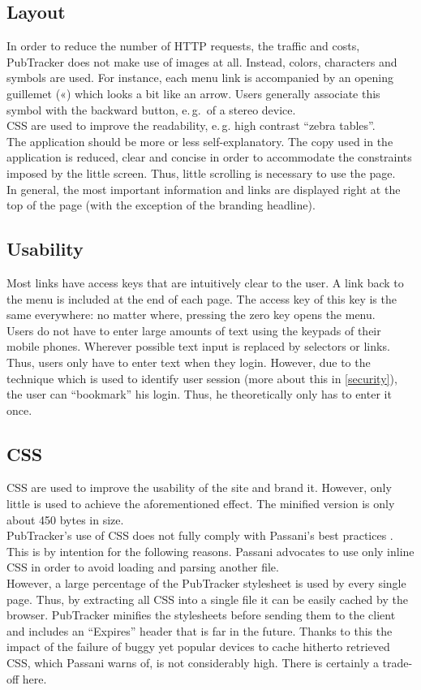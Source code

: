 \documentclass[a4paper,10pt]{scrartcl}
\begin{document}
\subsection{Layout}
In order to reduce the number of \ac{HTTP} requests, the traffic and costs,
PubTracker does not make use of images at all. Instead, colors, characters and
symbols are used. For instance, each menu link is accompanied by an opening guillemet («)
which looks a bit like an arrow. Users generally associate this symbol with the
backward button, e.\,g.\ of a stereo device.\\
\ac{CSS} are used to improve the readability, e.\,g. high contrast ``zebra
tables''.\\ The application should be more or less self-explanatory. The copy used in the
application is reduced, clear and concise in order to accommodate the
constraints imposed by the little screen. Thus, little
scrolling is necessary to use the page.\\
In general, the most important information and links are displayed right at the
top of the page (with the exception of the branding headline).

\subsection{Usability}
Most links have access keys that are intuitively clear to the user. A link back
to the menu is included at the end of each page. The access key of this key is
the same everywhere: no matter where, pressing the zero key opens the menu.\\
Users do not have to enter large amounts of text using the keypads of their
mobile phones. Wherever possible text input is replaced by selectors or links.
Thus, users only have to enter text when they login. However, due to the
technique which is used to identify user session (more about this in
\ref{security}), the user can ``bookmark'' his login. Thus, he theoretically
only has to enter it once.

\subsection{CSS}
\acs{CSS} are used to improve the usability of the site and brand it.
However, only little is used to achieve the aforementioned effect. The minified
version is only about 450 bytes in size.\\
PubTracker's use of \ac{CSS} does not fully comply with Passani's best
practices \cite{passani}. This is by intention for the following reasons.
Passani advocates to use only inline \ac{CSS} in order to avoid loading and
parsing another file.\\
However, a large percentage of the PubTracker stylesheet
is used by every single page. Thus, by extracting all \ac{CSS} into a single
file it can be easily cached by the browser. PubTracker minifies the
stylesheets before sending them to the client and includes an ``Expires''
header that is far in the future. Thanks to this the impact of the failure
of buggy yet popular devices to cache hitherto retrieved \ac{CSS}, which Passani
warns of, is not considerably high. There is certainly a trade-off here.
\end{document}
